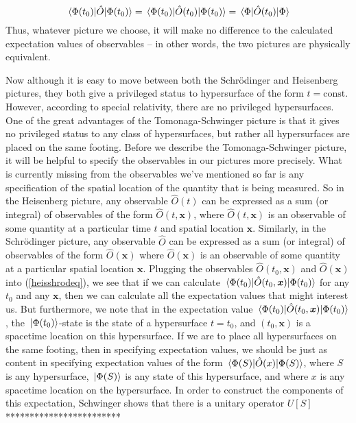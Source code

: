 \begin{equation}\label{heisshrodeq}
  \ev*{\hat{O}}{\Phi(t_0)}=\ev*{\hat{O}(t_0)}{\Phi(t_0)}=\ev*{\hat{O}(t_0)}{\Phi}
\end{equation}
Thus, whatever picture we choose, it will make no difference to the calculated expectation values of observables -- in other words, the two pictures are physically equivalent.

Now although it is easy to move between both the Schr\"{o}dinger and Heisenberg pictures, they both give a privileged status to hypersurface of the form $t=\text{const}$. However, according to special relativity, there are no privileged hypersurfaces. One of the great advantages of the Tomonaga-Schwinger picture is that it gives no privileged status to any class of hypersurfaces, but rather all hypersurfaces are placed on the same footing. Before we describe the Tomonaga-Schwinger picture, it will be helpful to specify the observables in our pictures more precisely. What is currently missing from the observables we've mentioned so far is any specification of the spatial location of the quantity that is being measured. So in the Heisenberg picture, any observable $\hat{O}(t)$ can be expressed as a sum (or integral) of observables of the form $\hat{O}(t, \bm{x})$, where $\hat{O}(t, \bm{x})$ is an observable of some quantity at a particular time $t$ and spatial location $\bm{x}$. Similarly, in the Schr\"{o}dinger picture, any observable $\hat{O}$ can be expressed as a sum (or integral) of observables of the form $\hat{O}(\bm{x})$ where $\hat{O}(\bm{x})$ is an observable of some quantity at a particular spatial location $\bm{x}$. Plugging the observables $\hat{O}(t_0,\bm{x})$ and $\hat{O}(\bm{x})$ into (\ref{heisshrodeq}), we see that if we can calculate $\ev*{\hat{O}(t_0,\bm{x})}{\Phi(t_0)}$ for any $t_0$ and any $\bm{x}$, then we can calculate all the expectation values that might interest us. But furthermore, we note that in the expectation value $\ev*{\hat{O}(t_0,\bm{x})}{\Phi(t_0)}$,  the $\ket*{\Phi(t_0)}$-state is the state of a hypersurface $t=t_0$, and $(t_0,\bm{x})$ is a spacetime location on this hypersurface. If we are to place all hypersurfaces on the same footing, then in specifying expectation values, we should be just as content in specifying expectation values of the form $\ev*{\hat{O}(x)}{\Phi(S)}$, where $S$ is any hypersurface, $\ket*{\Phi(S)}$ is any state of this hypersurface, and where $x$ is any spacetime location on the hypersurface. In order to construct the components of this expectation, Schwinger shows that there is a unitary operator $U[S]$ ************************

